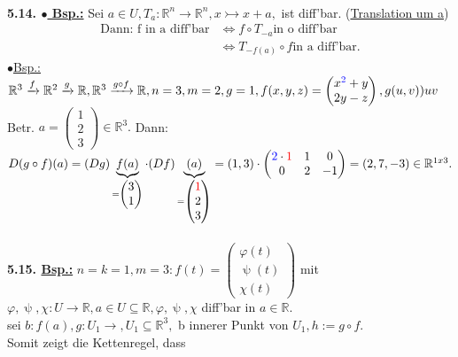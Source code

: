 \documentclass[]{scrartcl}
\begin{document}
	\\
	\textbf{5.14. \underline{$\bullet$ Bsp.:}} Sei $a\in U, T_a: 
	\mathbb{R}^n\rightarrow\mathbb{R}^n, x\rightarrowtail x+a,$ ist diff'bar. 
	(\ul{Translation um a})\\
	\begin{align}
		\text{Dann: f in a diff'bar} &\Leftrightarrow f \circ T_{-a} \text{in o 
		diff'bar}\\
		&\Leftrightarrow T_{-f(a)} \circ f \text{in a diff'bar.}
	\end{align}
	$\bullet$\underline{Bsp.:} 
	$\mathbb{R}^3\xrightarrow{f}\mathbb{R}^2\xrightarrow{g}\mathbb{R}, 
	\mathbb{R}^3\xrightarrow{g\circ f}\mathbb{R}, n=3, m=2, g=1, 
	f(x,y,z)=\begin{pmatrix}
		x^{\textcolor{blue}{2}}+y\\
		2y-z
	\end{pmatrix}, g(u,v))uv$\\
Betr. $a=\begin{pmatrix}
	1\\2\\3
\end{pmatrix}\in \mathbb{R}^3.$ Dann:$ D(g\circ 
f)(a)=(Dg)\underbrace{f(a)}_{=\begin{pmatrix}
	3\\1
\end{pmatrix}}\cdot(Df)\underbrace{(a)}_{=\begin{pmatrix}
	\textcolor{red}{1}\\2\\3
\end{pmatrix}}=(1,3)\cdot\begin{pmatrix}
	\textcolor{blue}{2}\cdot\textcolor{red}{1}&1&0\\
	0&2&-1
\end{pmatrix}=(2,7,-3)\in\mathbb{R}^{1 x 3}.$\\
\\
\textbf{5.15. \underline{Bsp.:}} $n=k=1, m=3: f(t)=\begin{pmatrix}
	\varphi(t)\\\uppsi(t)\\\chi(t)
\end{pmatrix}$ mit $\varphi, \uppsi, \chi:U\rightarrow\mathbb{R}, a\in U 
\subseteq\mathbb{R}, \varphi,\uppsi,\chi$ diff'bar in $a\in\mathbb{R}.$\\
sei $b:f(a), g:U_1\rightarrow, U_1\subseteq \mathbb{R}^3,$ b innerer Punkt von 
$U_1, h:=g\circ f.$\\
Somit zeigt die Kettenregel, dass\\
\end{document}
